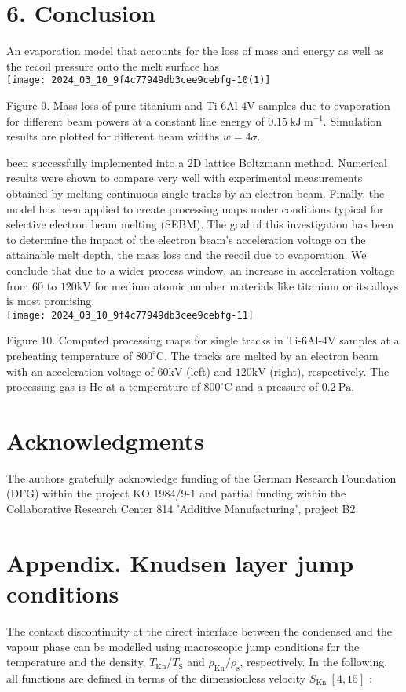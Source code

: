 \documentclass[10pt]{article}
\begin{document}
\section*{6. Conclusion}
An evaporation model that accounts for the loss of mass and energy as well as the recoil pressure onto the melt surface has\\
\texttt{[image: 2024\_03\_10\_9f4c77949db3cee9cebfg-10(1)]}

Figure 9. Mass loss of pure titanium and Ti-6Al-4V samples due to evaporation for different beam powers at a constant line energy of $0.15 \mathrm{~kJ} \mathrm{~m}^{-1}$. Simulation results are plotted for different beam widths $w=4 \sigma$.

been successfully implemented into a 2D lattice Boltzmann method. Numerical results were shown to compare very well with experimental measurements obtained by melting continuous single tracks by an electron beam. Finally, the model has been applied to create processing maps under conditions typical for selective electron beam melting (SEBM). The goal of this investigation has been to determine the impact of the electron beam's acceleration voltage on the attainable melt depth, the mass loss and the recoil due to evaporation. We conclude that due to a wider process window, an increase in acceleration voltage from 60 to $120 \mathrm{kV}$ for medium atomic number materials like titanium or its alloys is most promising.\\
\texttt{[image: 2024\_03\_10\_9f4c77949db3cee9cebfg-11]}

Figure 10. Computed processing maps for single tracks in Ti-6Al-4V samples at a preheating temperature of $800^{\circ} \mathrm{C}$. The tracks are melted by an electron beam with an acceleration voltage of $60 \mathrm{kV}$ (left) and $120 \mathrm{kV}$ (right), respectively. The processing gas is He at a temperature of $800^{\circ} \mathrm{C}$ and a pressure of $0.2 \mathrm{~Pa}$.

\section*{Acknowledgments}
The authors gratefully acknowledge funding of the German Research Foundation (DFG) within the project KO 1984/9-1 and partial funding within the Collaborative Research Center 814 'Additive Manufacturing', project B2.

\section*{Appendix. Knudsen layer jump conditions}
The contact discontinuity at the direct interface between the condensed and the vapour phase can be modelled using macroscopic jump conditions for the temperature and the density, $T_{\mathrm{Kn}} / T_{\mathrm{S}}$ and $\rho_{\mathrm{Kn}} / \rho_{\mathrm{s}}$, respectively. In the following,\\
all functions are defined in terms of the dimensionless velocity $S_{\text {Kn }}[4,15]$ :
\end{document}
